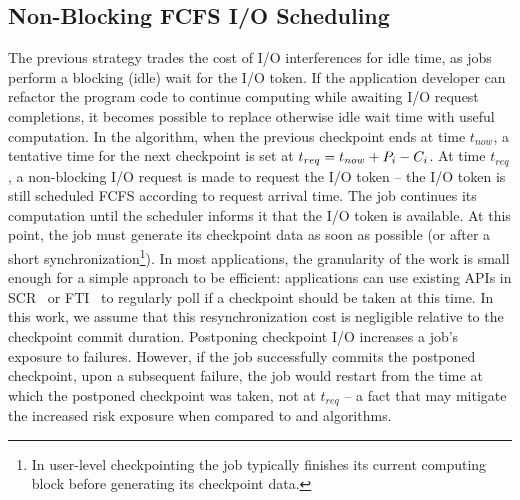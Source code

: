 
\subsection{Non-Blocking \fifononblock FCFS I/O Scheduling}
\label{sec:fcfsnonblock}

The previous strategy trades the cost of I/O interferences for
idle time, as jobs perform a blocking (idle) wait for the I/O token.
If the application developer can refactor the program code to continue
computing while awaiting I/O request completions, it becomes possible
to replace otherwise idle wait time with useful computation. In the
\fifononblock algorithm, when the previous checkpoint ends at time
$t_{now}$, a tentative time for the next checkpoint is set at
$t_{req}=t_{now}+P_{i}-C_{i}$.  At time $t_{req}$, a
non-blocking I/O request is made to request the I/O token -- the I/O
token is still scheduled FCFS according to request arrival time.  The
job continues its computation until the scheduler informs it that the
I/O token is available. At this point, the job must generate its
checkpoint data as soon as possible (or after a short
synchronization\footnote{In user-level checkpointing the job typically
  finishes its current computing block before generating its
  checkpoint data.}).  In most applications, the granularity of the
work is small enough for a simple approach to be efficient:
applications can use existing APIs in SCR~\cite{Moody10_SCR} or
FTI~\cite{Bautista-Gomez11_FTI} to regularly poll if a checkpoint
should be taken at this time. In this work, we assume that this
resynchronization cost is negligible relative to the checkpoint commit
duration.
%
%
Postponing checkpoint I/O increases a job's exposure to failures.  However,
if the job successfully commits the postponed checkpoint, upon a subsequent failure,
the job would restart from the time at which the postponed checkpoint was taken, not
at $t_{req}$ -- a fact that may mitigate the increased risk exposure when
compared to \fifoblock and \nocoop algorithms.


